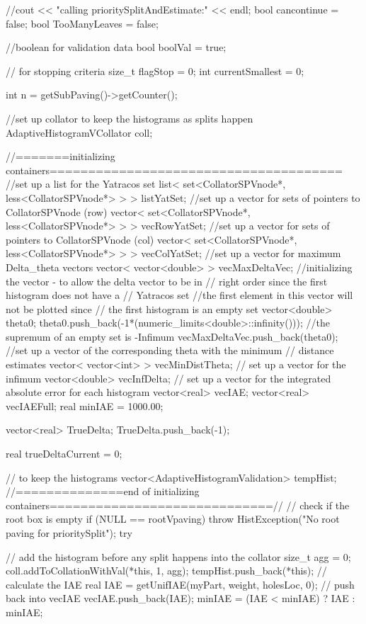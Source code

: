 \begin{DoxyCode}
{
    //cout << "calling prioritySplitAndEstimate:" << endl;
   bool cancontinue = false;
   bool TooManyLeaves = false;
   
    //boolean for validation data
    bool boolVal = true;
    
    // for stopping criteria
    size_t flagStop = 0;
    int currentSmallest = 0;
    
    int n = getSubPaving()->getCounter();
    
    //set up collator to keep the histograms as splits happen
    AdaptiveHistogramVCollator coll;
    
   //=======initializing containers======================================
  //set up a list for the Yatracos set 
  list< set<CollatorSPVnode*, less<CollatorSPVnode*> > > listYatSet;
  //set up a vector for sets of pointers to CollatorSPVnode (row)
  vector< set<CollatorSPVnode*, less<CollatorSPVnode*> > > vecRowYatSet;
  //set up a vector for sets of pointers to CollatorSPVnode (col)
  vector< set<CollatorSPVnode*, less<CollatorSPVnode*> > > vecColYatSet;    
  //set up a vector for maximum Delta_theta vectors
  vector< vector<double> > vecMaxDeltaVec;
  //initializing the vector - to allow the delta vector to be in 
  // right order  since the first histogram does not have a 
  // Yatracos set
  //the first element in this vector will not be plotted since 
  // the first histogram is an empty set
  vector<double> theta0;
  theta0.push_back(-1*(numeric_limits<double>::infinity())); 
  //the supremum of an empty set is -Infimum 
  vecMaxDeltaVec.push_back(theta0);
  //set up a vector of the corresponding theta with the minimum 
  // distance estimates
  vector< vector<int> > vecMinDistTheta;
  // set up a vector for the infimum 
  vector<double> vecInfDelta;
  // set up a vector for the integrated absolute error for each histogram
   vector<real> vecIAE; 
   vector<real> vecIAEFull;
   real minIAE = 1000.00;
   
   vector<real> TrueDelta;
   TrueDelta.push_back(-1); 

  real trueDeltaCurrent = 0;
  
   // to keep the histograms
   vector<AdaptiveHistogramValidation> tempHist;
   //==============end of initializing
       containers=============================//   
   // check if the root box is empty
    if (NULL == rootVpaving) {
            throw HistException("No root paving for prioritySplit");
    }
    try {       
        // add the histogram before any split happens into the collator
        size_t agg = 0;
      coll.addToCollationWithVal(*this, 1, agg);
      tempHist.push_back(*this);
      // calculate the IAE 
      real IAE = getUnifIAE(myPart, weight, holesLoc, 0);
      // push back into vecIAE 
      vecIAE.push_back(IAE);
      minIAE = (IAE < minIAE) ? IAE : minIAE;
      
}}
\end{DoxyCode}
